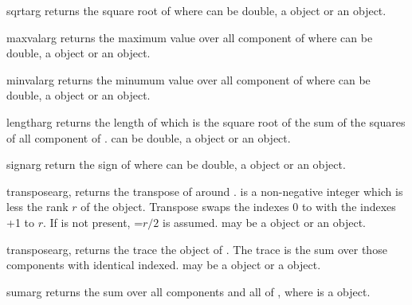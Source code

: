 \begin{funcdesc}{sqrt}{arg}
returns the square root of  where 
can be double, a \Data object or an \numarray object.
\end{funcdesc}

\begin{funcdesc}{maxval}{arg}
returns the maximum value over all component of  where 
can be double, a \Data object or an \numarray object.
\end{funcdesc}

\begin{funcdesc}{minval}{arg}
returns the minumum value over all component of  where 
can be double, a \Data object or an \numarray object.
\end{funcdesc}

\begin{funcdesc}{length}{arg}
returns the length of  which is the
square root of the sum of the squares of all component of . 
can be double, a \Data object or an \numarray object.
\end{funcdesc}

\begin{funcdesc}{sign}{arg}
return the sign of  where 
can be double, a \Data object or an \numarray object.
\end{funcdesc}

\begin{funcdesc}{transpose}{arg,}
returns the transpose of  around .  is a non-negative integer
which is less the rank $r$ of the object. Transpose swaps the indexes $0$ to 
with the indexes +1 to $r$. If  is not present, =$r/2$ is assumed.
may be a \Data object or an \numarray object.
\end{funcdesc}

\begin{funcdesc}{transpose}{arg,}
returns the trace the object of . The trace is the sum over those components
with identical indexed. 
may be a \Data object or a \numarray object.
\end{funcdesc}

\begin{funcdesc}{sum}{arg}
returns the sum over all components and all 
\DataSamplePoints of , where 
is a \Data object. 
\end{funcdesc}

